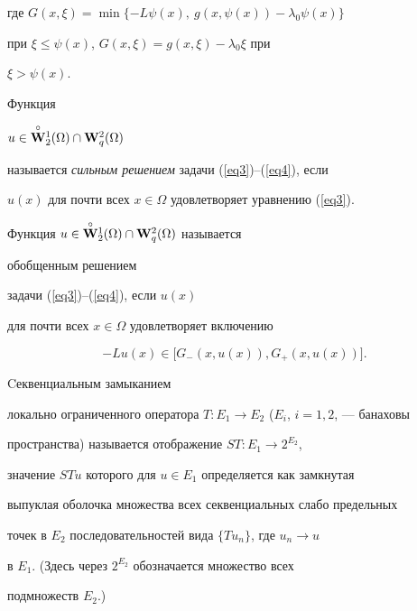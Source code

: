 где $G(x,\xi)=\min\{-L\psi(x),\ g(x,\psi(x))-\lambda_0\psi(x)\}$


при $\xi\le\psi(x)$, $G(x,\xi)=g(x,\xi)-\lambda_0 \xi$ при


$\xi>\psi(x)$.








\begin{defn}


Функция


$u\in \overset{\circ}{\bold W}{}_2^1(\Omega)\cap {\bold W}_q^2(\Omega)$


называется {\it сильным решением} задачи (\ref{eq3})--(\ref{eq4}), если


$u(x)$ для почти всех $x\in\Omega$ удовлетворяет уравнению (\ref{eq3}).


\end{defn}








\begin{defn}


Функция $u\in \overset{\circ}{\bold


W}{}_2^1(\Omega)\cap {\bold{W}}_q^2(\Omega)$ называется {\it


обобщенным решением} задачи (\ref{eq3})--(\ref{eq4}), если $u(x)$


для почти всех $x\in\Omega$ удовлетворяет включению


$$


-Lu(x)\in\big[G_-(x,u(x)),G_+(x,u(x))\big].


$$


\end{defn}








\begin{defn}


Cеквенциальным замыканием


локально ограниченного оператора $T:E_1\to E_2$ ($E_i$, $i=1,2$, --- банаховы


пространства) называется отображение $ST:E_1\to 2^{E_2}$,


значение $STu$ которого для $u\in E_1$ определяется как замкнутая


выпуклая оболочка множества всех секвенциальных слабо предельных


точек в $E_2$ последовательностей вида $\{Tu_n\}$, где $u_n\to u$


в $E_1$. (Здесь через $2^{E_2}$ обозначается множество всех


подмножеств $E_2$.)


\end{defn}








